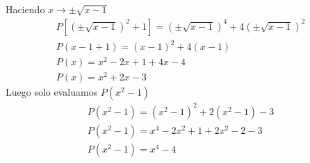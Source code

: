 \begin{section-problem}
{                Haciendo $x \rightarrow \pm \sqrt{x - 1}$
                \begin{gather*}
                    P\left[ \left(\pm \sqrt{x - 1}\right)^2 + 1 \right] = \left(\pm \sqrt{x - 1}\right)^4 + 4 \left(\pm \sqrt{x - 1}\right)^2 \\
                    P\left( x - 1 + 1 \right) = \left(x - 1\right)^2 + 4 \left(x - 1\right)\\
                    P\left( x \right) = x^2 - 2 x + 1 + 4 x - 4\\
                    P\left( x \right) = x^2 + 2x - 3
                \end{gather*}
                Luego solo evaluamos $P(x^2 - 1)$
                \begin{gather*}
                    P\left( x^2 - 1 \right) = \left(x^2 - 1\right)^2 + 2\left(x^2 - 1\right) - 3\\
                    P\left( x^2 - 1 \right) = x^4 - 2 x^2 + 1 + 2 x^2 - 2 - 3\\
                    P\left( x^2 - 1 \right) = \boxed{x^4 - 4}
                \end{gather*}
            }

        \end{section-problem}

